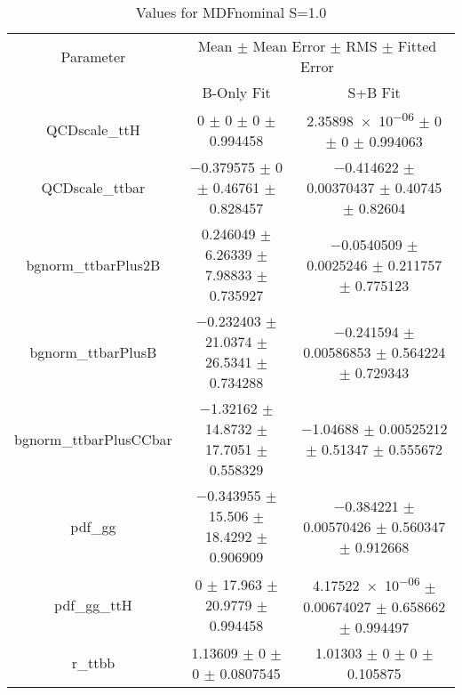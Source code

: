 \begin{table}
\centering
\caption{Values for MDFnominal S=1.0}
\begin{tabular}{ccc}
\toprule
Parameter & \multicolumn{2}{c}{Mean $\pm$ Mean Error $\pm$ RMS $\pm$ Fitted Error}\\
 & B-Only Fit & S+B Fit\\
\midrule
QCDscale\_ttH & \num{0} $\pm$ \num{0} $\pm$ \num{0} $\pm$ \num{0.994458} & \num{2.35898e-06} $\pm$ \num{0} $\pm$ \num{0} $\pm$ \num{0.994063}\\
QCDscale\_ttbar & \num{-0.379575} $\pm$ \num{0} $\pm$ \num{0.46761} $\pm$ \num{0.828457} & \num{-0.414622} $\pm$ \num{0.00370437} $\pm$ \num{0.40745} $\pm$ \num{0.82604}\\
bgnorm\_ttbarPlus2B & \num{0.246049} $\pm$ \num{6.26339} $\pm$ \num{7.98833} $\pm$ \num{0.735927} & \num{-0.0540509} $\pm$ \num{0.0025246} $\pm$ \num{0.211757} $\pm$ \num{0.775123}\\
bgnorm\_ttbarPlusB & \num{-0.232403} $\pm$ \num{21.0374} $\pm$ \num{26.5341} $\pm$ \num{0.734288} & \num{-0.241594} $\pm$ \num{0.00586853} $\pm$ \num{0.564224} $\pm$ \num{0.729343}\\
bgnorm\_ttbarPlusCCbar & \num{-1.32162} $\pm$ \num{14.8732} $\pm$ \num{17.7051} $\pm$ \num{0.558329} & \num{-1.04688} $\pm$ \num{0.00525212} $\pm$ \num{0.51347} $\pm$ \num{0.555672}\\
pdf\_gg & \num{-0.343955} $\pm$ \num{15.506} $\pm$ \num{18.4292} $\pm$ \num{0.906909} & \num{-0.384221} $\pm$ \num{0.00570426} $\pm$ \num{0.560347} $\pm$ \num{0.912668}\\
pdf\_gg\_ttH & \num{0} $\pm$ \num{17.963} $\pm$ \num{20.9779} $\pm$ \num{0.994458} & \num{4.17522e-06} $\pm$ \num{0.00674027} $\pm$ \num{0.658662} $\pm$ \num{0.994497}\\
r\_ttbb & \num{1.13609} $\pm$ \num{0} $\pm$ \num{0} $\pm$ \num{0.0807545} & \num{1.01303} $\pm$ \num{0} $\pm$ \num{0} $\pm$ \num{0.105875}\\
\bottomrule
\end{tabular}
\end{table}